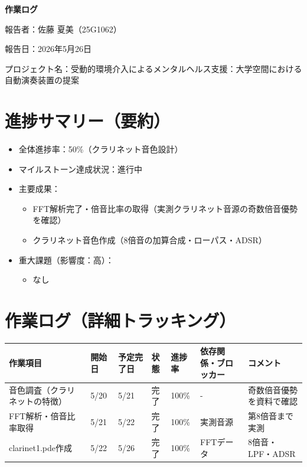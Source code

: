 \documentclass[uplatex,dvipdfmx]{jlreq}
\begin{document}
{\LARGE \textbf{作業ログ}}

報告者：佐藤 夏美（25G1062）

報告日：2026年5月26日

プロジェクト名：受動的環境介入によるメンタルヘルス支援：大学空間における自動演奏装置の提案

\section{進捗サマリー（要約）}
\begin{itemize}
  \item 全体進捗率：50\%（クラリネット音色設計）
  \item マイルストーン達成状況：進行中
  \item 主要成果：
  \begin{itemize}
    \item FFT解析完了・倍音比率の取得（実測クラリネット音源の奇数倍音優勢を確認）
    \item クラリネット音色作成（8倍音の加算合成・ローパス・ADSR）
  \end{itemize}
  \item 重大課題（影響度：高）：
  \begin{itemize}
    \item なし
  \end{itemize}
\end{itemize}

\section{作業ログ（詳細トラッキング）}
\begin{table}[H]
  \centering
  \begin{tabular}{p{2.2cm}p{1cm}p{1cm}p{1cm}p{1cm}p{2.2cm}p{2.2cm}}
\hline
作業項目 & 開始日 & 予定完了日 & 状態 & 進捗率 & 依存関係・ブロッカー & コメント \\ \hline \hline
音色調査（クラリネットの特徴） & 5/20 & 5/21 & 完了 & 100\% & - & 奇数倍音優勢を資料で確認 \\ \hline
FFT解析・倍音比率取得 & 5/21 & 5/22 & 完了 & 100\% & 実測音源 & 第8倍音まで実測 \\ \hline
clarinet1.pde作成 & 5/22 & 5/26 & 完了 & 100\% & FFTデータ & 8倍音・LPF・ADSR \\ \hline
  \end{tabular}
\end{table}
\end{document}
